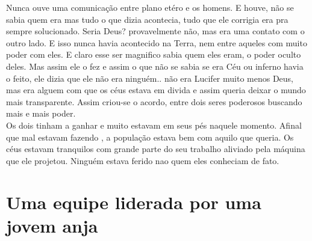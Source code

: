 \documentclass{book}
\begin{document}
 Nunca ouve uma comunicação entre plano etéro e os homens. E houve, não se sabia quem era mas tudo o que dizia acontecia, tudo que ele corrigia era pra sempre solucionado. Seria Deus? provavelmente não, mas era uma contato com o outro lado. E isso nunca havia acontecido na Terra, nem entre aqueles com muito poder com eles. E claro esse ser magnifico sabia quem eles eram, o poder oculto deles. Mas assim ele o fez e assim o que não se sabia se era Céu ou inferno havia o feito, ele dizia que ele não era ninguém.. não era Lucifer muito menos Deus, mas era alguem com que os céus estava em divida e assim queria deixar o mundo mais transparente. Assim criou-se o acordo, entre dois seres poderosos buscando mais e mais poder. \\
 
  Os dois tinham a ganhar e muito estavam em seus pés naquele momento. Afinal que mal estavam fazendo , a população estava bem com aquilo que queria. Os céus estavam tranquilos com grande parte do seu trabalho aliviado pela máquina que ele projetou. Ninguém estava ferido nao quem eles conheciam de fato. \\
  
  \section*{Uma equipe liderada por uma jovem anja}
  
\end{document}
